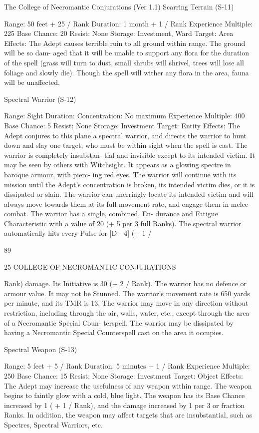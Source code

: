 \begin{Chapter}{The College of Necromantic Conjurations (Ver 1.1)}
Scarring Terrain (S-11) 

Range: 50 feet + 25 / Rank 
Duration: 1 month + 1 / Rank 
Experience Multiple: 225 
Base Chance: 20%
Resist: None 
Storage: Investment, Ward 
Target: Area 
Effects:  The  Adept  causes  terrible  ruin  to  all 
ground  within  range.  The  ground  will  be  so  dam-
aged that it will be unable to support any flora for 
the  duration  of  the  spell  (grass  will  turn  to  dust, 
small shrubs will shrivel, trees will lose all foliage 
and  slowly  die).  Though  the  spell  will  wither  any 
flora in the area, fauna will be unaffected. 

Spectral Warrior (S-12) 

Range: Sight 
Duration: Concentration: No maximum 
Experience Multiple: 400 
Base Chance: 5%
Resist: None 
Storage: Investment 
Target: Entity 
Effects: The Adept conjures to this plane a spectral 
warrior,  and  directs  the  warrior  to  hunt  down  and 
slay one target, who must be within sight when the 
spell  is  cast.  The  warrior  is  completely  insubstan-
tial  and  invisible  except  to  its  intended  victim.  It 
may  be  seen  by  others  with Witchsight.  It  appears 
as a glowing spectre in baroque armour, with pierc-
ing  red  eyes.  The  warrior  will  continue  with  its 
mission  until  the  Adept’s  concentration  is  broken, 
its intended victim dies, or it is dissipated or slain. 
The  warrior  can  unerringly  locate  its  intended 
victim  and  will  always  move  towards  them  at  its 
full  movement  rate,  and  engage  them  in  melee 
combat.  The  warrior  has  a  single,  combined,  En-
durance and Fatigue Characteristic with a value of 
20  (+  5  per  3  full  Ranks).  The  spectral  warrior 
automatically  hits  every  Pulse  for  [D  -  4]  (+  1  / 

89 

25 COLLEGE OF NECROMANTIC CONJURATIONS 

Rank) damage. Its Initiative is 30 (+ 2 / Rank). The 
warrior has no defence or armour value. It may not 
be  Stunned.  The  warrior’s  movement  rate  is  650 
yards  per  minute,  and  its  TMR  is  13.  The  warrior 
may  move  in  any  direction  without  restriction, 
including through the air, walls, water, etc., except 
through  the  area  of  a  Necromantic  Special  Coun-
terspell. The warrior may be dissipated by having a 
Necromantic Special Counterspell cast on the area 
it occupies. 

Spectral Weapon (S-13) 

Range: 5 feet + 5 / Rank 
Duration: 5 minutes + 1 / Rank 
Experience Multiple: 250 
Base Chance: 15%
Resist: None 
Storage: Investment 
Target: Object 
Effects:  The  Adept  may  increase  the  usefulness 
of any weapon within range. The weapon begins to 
faintly  glow  with  a  cold,  blue  light.  The  weapon 
has its Base  Chance  increased  by  1  (  +  1  / Rank), 
and  the  damage  increased  by  1  per  3  or  fraction 
Ranks.  In  addition,  the  weapon  may  affect  targets 
that  are  insubstantial,  such  as  Spectres,  Spectral 
Warriors, etc. 


\end{Chapter}
